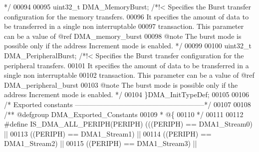 \begin{DoxyCode}
{       */}
00094 
00095   uint32\_t DMA_MemoryBurst;        \textcolor{comment}{/*!< Specifies the Burst transfer configuration for the memory
       transfers. }
00096 \textcolor{comment}{                                        It specifies the amount of data to be transferred in a single
       non interruptable }
00097 \textcolor{comment}{                                        transaction. This parameter can be a value of @ref
       DMA\_memory\_burst }
00098 \textcolor{comment}{                                        @note The burst mode is possible only if the address Increment
       mode is enabled. */}
00099 
00100   uint32\_t DMA_PeripheralBurst;    \textcolor{comment}{/*!< Specifies the Burst transfer configuration for the peripheral
       transfers. }
00101 \textcolor{comment}{                                        It specifies the amount of data to be transferred in a single
       non interruptable }
00102 \textcolor{comment}{                                        transaction. This parameter can be a value of @ref
       DMA\_peripheral\_burst}
00103 \textcolor{comment}{                                        @note The burst mode is possible only if the address Increment
       mode is enabled. */}
00104 \}DMA\_InitTypeDef;
00105 
00106 \textcolor{comment}{/* Exported constants --------------------------------------------------------*/}
00107 
00108 \textcolor{comment}{/** @defgroup DMA\_Exported\_Constants}
00109 \textcolor{comment}{  * @\{}
00110 \textcolor{comment}{  */}
00111 
00112 \textcolor{preprocessor}{#}\textcolor{preprocessor}{define} \textcolor{preprocessor}{IS\_DMA\_ALL\_PERIPH}\textcolor{preprocessor}{(}\textcolor{preprocessor}{PERIPH}\textcolor{preprocessor}{)} \textcolor{preprocessor}{(}\textcolor{preprocessor}{(}\textcolor{preprocessor}{(}\textcolor{preprocessor}{PERIPH}\textcolor{preprocessor}{)} \textcolor{preprocessor}{==} DMA1_Stream0\textcolor{preprocessor}{)} \textcolor{preprocessor}{||}
00113                                    \textcolor{preprocessor}{(}\textcolor{preprocessor}{(}\textcolor{preprocessor}{PERIPH}\textcolor{preprocessor}{)} \textcolor{preprocessor}{==} DMA1_Stream1\textcolor{preprocessor}{)} \textcolor{preprocessor}{||}
00114                                    \textcolor{preprocessor}{(}\textcolor{preprocessor}{(}\textcolor{preprocessor}{PERIPH}\textcolor{preprocessor}{)} \textcolor{preprocessor}{==} DMA1_Stream2\textcolor{preprocessor}{)} \textcolor{preprocessor}{||}
00115                                    \textcolor{preprocessor}{(}\textcolor{preprocessor}{(}\textcolor{preprocessor}{PERIPH}\textcolor{preprocessor}{)} \textcolor{preprocessor}{==} DMA1_Stream3\textcolor{preprocessor}{)} \textcolor{preprocessor}{||}

\end{DoxyCode}
